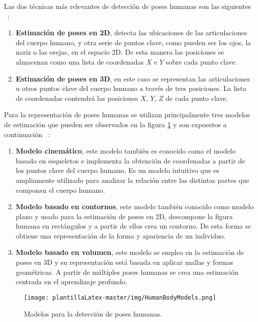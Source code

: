 Las dos técnicas más relevantes de detección de poses humanas son las siguientes ~\cite{wiki:poses}:
\begin{enumerate}
    \item \textbf{Estimación de poses en 2D}, detecta las ubicaciones de las articulaciones del cuerpo humano, y otra serie de puntos clave, como pueden ser los ojos, la nariz o las orejas, en el espacio 2D. De esta manera las posiciones se almacenan como una lista de coordenadas $X$ e $Y$ sobre cada punto clave.
    \item \textbf{Estimación de poses en 3D}, en este caso se representan las articulaciones u otros puntos clave del cuerpo humano a través de tres posiciones. La lista de coordenadas contendrá las posiciones $X$, $Y$, $Z$ de cada punto clave. 
\end{enumerate}


Para la representación de poses humanas se utilizan principalmente tres modelos de estimación que pueden ser observados en la figura \ref{fig:HumanBody} y son expuestos a continuación ~\cite{dang2019deep, s16121966}:
\begin{enumerate}
    \item \textbf{Modelo cinemático}, este modelo también es conocido como el modelo basado en esqueletos e implementa la obtención de coordenadas a partir de los puntos clave del cuerpo humano. Es un modelo intuitivo que es ampliamente utilizado para analizar la relación entre las distintas partes que componen el cuerpo humano.
    \item \textbf{Modelo basado en contornos}, este modelo también conocido como modelo plano y usado para la estimación de poses en 2D, descompone la figura humana en rectángulos y a partir de ellos crea un contorno. De esta forma se obtiene una representación de la forma y apariencia de un individuo.  
    \item \textbf{Modelo basado en volumen}, este modelo se emplea en la estimación de poses en 3D y su representación está basada en aplicar mallas y formas geométricas. A partir de múltiples poses humanas se crea una estimación centrada en el aprendizaje profundo.
\end{enumerate}

\begin{figure}[H]
    \centering
    \texttt{[image: plantillaLatex-master/img/HumanBodyModels.png]}
    \caption{Modelos para la detección de poses humanas.}
    \label{fig:HumanBody}
\end{figure}

